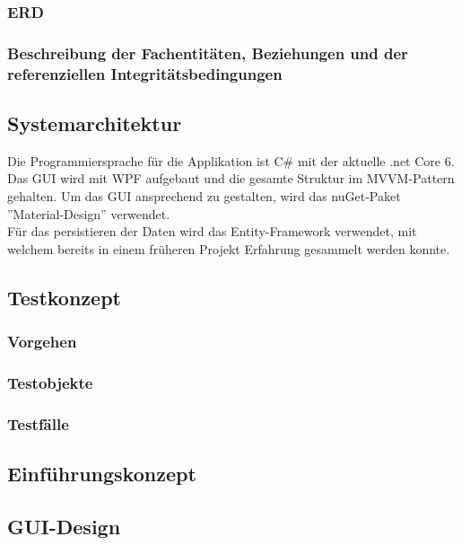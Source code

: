 \subsubsection{ERD}
\subsubsection{Beschreibung der Fachentitäten, Beziehungen und der referenziellen Integritätsbedingungen}
\subsection{Systemarchitektur}
Die Programmiersprache für die Applikation ist C\# mit der aktuelle .net Core 6. Das GUI wird mit WPF aufgebaut und die gesamte Struktur im MVVM-Pattern gehalten. Um das GUI ansprechend zu gestalten, wird das nuGet-Paket ''Material-Design'' verwendet.\\
Für das persistieren der Daten wird das Entity-Framework verwendet, mit welchem bereits in einem früheren Projekt Erfahrung gesammelt werden konnte.
\subsection{Testkonzept}
\subsubsection{Vorgehen}
\subsubsection{Testobjekte}
\subsubsection{Testfälle}
\subsection{Einführungskonzept}
\subsection{GUI-Design}
